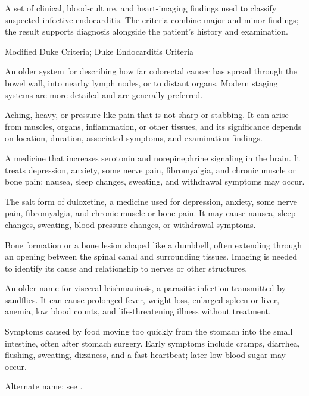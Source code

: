  A set of clinical, blood-culture, and heart-imaging findings used to classify suspected infective endocarditis. The criteria combine major and minor findings; the result supports diagnosis alongside the patient’s history and examination.

\synonyms
Modified Duke Criteria; Duke Endocarditis Criteria

 An older system for describing how far colorectal cancer has spread through the bowel wall, into nearby lymph nodes, or to distant organs. Modern staging systems are more detailed and are generally preferred.

 Aching, heavy, or pressure-like pain that is not sharp or stabbing. It can arise from muscles, organs, inflammation, or other tissues, and its significance depends on location, duration, associated symptoms, and examination findings.

 A medicine that increases serotonin and norepinephrine signaling in the brain. It treats depression, anxiety, some nerve pain, fibromyalgia, and chronic muscle or bone pain; nausea, sleep changes, sweating, and withdrawal symptoms may occur.

 The salt form of duloxetine, a medicine used for depression, anxiety, some nerve pain, fibromyalgia, and chronic muscle or bone pain. It may cause nausea, sleep changes, sweating, blood-pressure changes, or withdrawal symptoms.

 Bone formation or a bone lesion shaped like a dumbbell, often extending through an opening between the spinal canal and surrounding tissues. Imaging is needed to identify its cause and relationship to nerves or other structures.

 An older name for visceral leishmaniasis, a parasitic infection transmitted by sandflies. It can cause prolonged fever, weight loss, enlarged spleen or liver, anemia, low blood counts, and life-threatening illness without treatment.

 Symptoms caused by food moving too quickly from the stomach into the small intestine, often after stomach surgery. Early symptoms include cramps, diarrhea, flushing, sweating, dizziness, and a fast heartbeat; later low blood sugar may occur.

 Alternate name; see .

